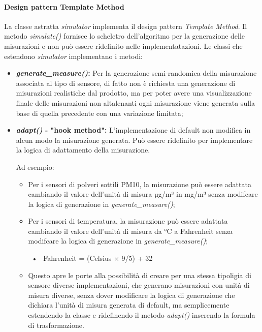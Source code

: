 \paragraph{Design pattern Template Method} \label{sec:templateSIM}

La classe astratta \textit{simulator} implementa il design pattern \textit{Template Method}. Il metodo \textit{simulate()} fornisce lo scheletro dell'algoritmo per la generazione delle misurazioni e non può essere ridefinito nelle implementatazioni. Le classi che estendono \textit{simulator} implementano i metodi:
\begin{itemize}
    \item \textbf{\textit{generate\_measure()}:} Per la generazione semi-randomica della misurazione associata al tipo di sensore, di fatto non è richiesta una generazione di misurazioni realistiche dal prodotto, ma per poter avere una visualizzazione finale delle misurazioni non altalenanti ogni misurazione viene generata sulla base di quella precedente con una variazione limitata;
    
    \item \textbf{\textit{adapt()} - "hook method":} L'implementazione di default non modifica in alcun modo la misurazione generata. Può essere ridefinito per implementare la logica di adattamento della misurazione.
    
    Ad esempio:
    \begin{itemize}
        \item Per i sensori di polveri sottili PM10, la misurazione può essere adattata cambiando il valore dell'unità di misura µg/m³ in mg/m³ senza modifcare la logica di generazione in \textit{generate\_measure()};
        
        \item Per i sensori di temperatura, la misurazione può essere adattata cambiando il valore dell'unità di misura da °C a Fahrenheit  senza modifcare la logica di generazione in \textit{generate\_measure()};
        
        ~•~ Fahrenheit = (Celsius × 9/5) + 32
 
        \item Questo apre le porte alla possibilità di creare per una stessa tipoligia di sensore diverse implementazioni, che generano misurazioni con unità di misura diverse, senza dover modificare la logica di generazione che dichiara l'unità di misura generata di default, ma semplicemente estendendo la classe e ridefinendo il metodo \textit{adapt()} inserendo la formula di trasformazione.
        

\end{itemize}
\end{itemize}
